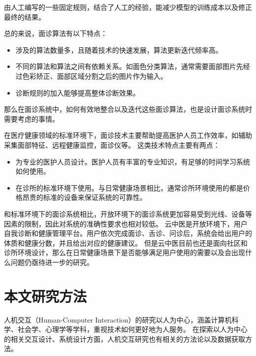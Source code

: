 由人工编写的一些固定规则，结合了人工的经验，能减少模型的训练成本以及修正最终的结果。

总的来说，面诊算法有以下特点：

\begin{itemize}
    \item 涉及的算法数量多，且随着技术的快速发展，算法更新迭代频率高。
    \item 不同的算法和算法之间有依赖关系。如面色分类算法，通常需要面部图片先经过色彩矫正、面部区域分割之后的图片作为输入。
    \item 诊断规则的加入能够提高整体诊断效果。
\end{itemize}

那么在面诊系统中，如何有效地整合以及迭代这些面诊算法，也是设计面诊系统时需要考虑的事情。

在医疗健康领域的标准环境下，面诊技术主要帮助提高医护人员工作效率，如辅助采集面部特征\cite{张红凯2015中医面诊信息采集与识别方法研究进展}、远程健康监控\cite{Hossain2015Cloud}，面诊仪\cite{邸丹2016手持式舌象仪的研制}等。
这类技术特点主要有两点：
\begin{itemize}
    \item 为专业的医护人员设计。医护人员有丰富的专业知识，有足够的时间学习系统如何使用。
    \item 在诊所的标准环境下使用。与日常健康场景相比，通常诊所环境使用的都是价格昂贵的标准的设备来保证系统的可靠性。
\end{itemize}


和标准环境下的面诊系统相比，开放环境下的面诊系统更加容易受到光线、设备等因素的限制，因此对系统的准确性要求也相对较低。
云中医是开放环境下，用户自我诊断和健康管理平台。用户依次完成面诊、舌诊、问诊后，系统会给出用户的体质和健康分数，并且给出对应的健康建议。
但是云中医目前也还是面向社区和诊所环境设计，那么在日常健康场景下是否能够满足用户使用的需要以及会出现什么问题仍亟待进一步的研究。




\section{本文研究方法}

人机交互（Human-Computer Interaction）的研究以人为中心，涵盖计算机科学、社会学、心理学等学科，重视技术如何更好地为人服务\cite{lazar2017research}。
在探索以人为中心的相关交互设计、系统设计方面，人机交互研究也有相关的方法论以及数据获取方法\cite{lazar2017research}。

